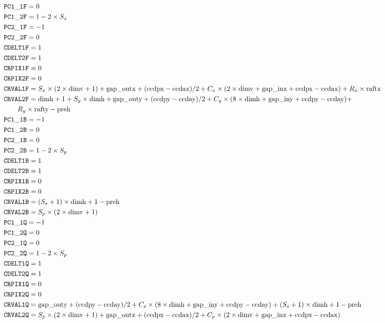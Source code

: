 \documentclass{article}[12pt]
\begin{document}
{\begin{align*}
& {\tt PC1\_1F} = 0 \\
& {\tt PC1\_2F} = 1 - 2 \times S_x \\
& {\tt PC2\_1F} = -1 \\
& {\tt PC2\_2F} = 0 \\
& {\tt CDELT1F} = 1 \\
& {\tt CDELT2F} = 1 \\
& {\tt CRPIX1F} = 0 \\
& {\tt CRPIX2F} = 0 \\
& {\tt CRVAL1F} = S_x \times(2 \times {\rm dimv} + 1) + {\rm gap\_outx} + ({\rm ccdpx} - {\rm ccdax})/2 + C_x \times (2 \times {\rm dimv} + {\rm gap\_inx} + {\rm ccdpx} - {\rm ccdax}) + R_x \times {\rm raftx} \\
& {\tt CRVAL2F} = {\rm dimh} + 1 + S_y \times {\rm dimh} + {\rm gap\_outy} + ({\rm ccdpy} - {\rm ccday})/2 +  C_y \times ( 8 \times {\rm dimh} + {\rm gap\_iny} + {\rm ccdpy} - {\rm ccday}) + \\  &\qquad {} R_y \times {\rm rafty} - {\rm preh} \\
& {\tt PC1\_1B} = -1   \\
& {\tt PC1\_2B} = 0 \\
& {\tt PC2\_1B} = 0 \\
& {\tt PC2\_2B} = 1 - 2 \times S_p \\
& {\tt CDELT1B} = 1 \\
& {\tt CDELT2B} = 1 \\
& {\tt CRPIX1B} = 0 \\
& {\tt CRPIX2B} = 0 \\
& {\tt CRVAL1B} = (S_s + 1) \times {\rm dimh} + 1 - {\rm preh} \\
& {\tt CRVAL2B} = S_p \times (2 \times {\rm dimv} + 1)  \\
& {\tt PC1\_1Q} = -1   \\
& {\tt PC1\_2Q} = 0 \\
& {\tt PC2\_1Q} = 0 \\
& {\tt PC2\_2Q} = 1 - 2 \times S_p  \\
& {\tt CDELT1Q} = 1 \\
& {\tt CDELT2Q} = 1 \\
& {\tt CRPIX1Q} = 0 \\
& {\tt CRPIX2Q} = 0 \\
& {\tt CRVAL1Q} = {\rm gap\_outy} + ({\rm ccdpy} - {\rm ccday})/2 + C_s \times (8 \times {\rm dimh} + {\rm gap\_iny} + {\rm ccdpy} - {\rm ccday}) + (S_s + 1) \times {\rm dimh} + 1  - {\rm preh} \\
& {\tt CRVAL2Q} = S_p \times (2 \times {\rm dimv} + 1) +  {\rm gap\_outx} + ({\rm ccdpx} - {\rm ccdax})/2 + C_p \times ( 2 \times {\rm dimv} + {\rm gap\_inx} + {\rm ccdpx} - {\rm ccdax}) \\
\end{align*}

}
\end{document}
